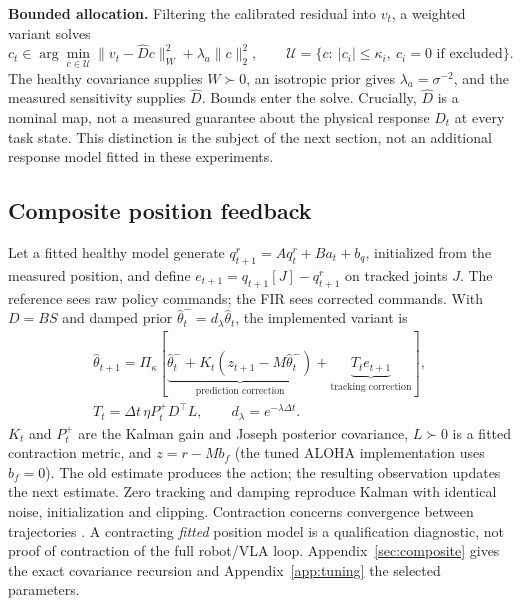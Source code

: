 \documentclass{article}
\begin{document}
\textbf{Bounded allocation.} Filtering the calibrated residual into $v_t$, a weighted
variant solves
\begin{equation}\label{eq:main-allocation}
 c_t\in\arg\min_{c\in\mathcal U}
       \|v_t-\widehat D c\|_W^2+\lambda_a\|c\|_2^2,
 \qquad \mathcal U=\{c:\ |c_i|\le\kappa_i,\ c_i=0\text{ if excluded}\}.
\end{equation}
The healthy covariance supplies $W\succ0$, an isotropic prior gives $\lambda_a=\sigma^{-2}$,
and the measured sensitivity supplies
$\widehat D$. Bounds enter the solve. Crucially, $\widehat D$ is a nominal map, not a measured
guarantee about the physical response $D_t$ at every task state. This distinction is the
subject of the next section, not an additional response model fitted in these experiments.

\subsection{Composite position feedback}
Let a fitted healthy model generate $q^r_{t+1}=Aq^r_t+Ba_t+b_q$, initialized from the measured
position, and define $e_{t+1}=q_{t+1}[J]-q^r_{t+1}$ on tracked joints $J$. The reference sees
raw policy commands; the FIR sees corrected commands. With $D=BS$ and damped prior
$\hat\theta_t^-=d_\lambda\hat\theta_t$, the implemented variant is
\begin{equation}\label{eq:main-composite}
\begin{aligned}
 \hat\theta_{t+1}=\Pi_\kappa\!\left[
 \underbrace{\hat\theta_t^-+K_t(z_{t+1}-M\hat\theta_t^-)}_{\text{prediction correction}}
 +\underbrace{T_t e_{t+1}}_{\text{tracking correction}}\right],\\
 T_t=\Delta t\,\eta P_t^+D^\top L,
 \qquad d_\lambda=e^{-\lambda\Delta t}.
\end{aligned}
\end{equation}
$K_t$ and $P_t^+$ are the Kalman gain and Joseph posterior covariance, $L\succ0$ is a fitted
contraction metric, and $z=r-Mb_f$ (the tuned ALOHA implementation uses $b_f=0$).
The old estimate produces the action; the resulting observation updates the next estimate.
Zero tracking and damping reproduce Kalman with identical noise, initialization and clipping.
Contraction concerns convergence between trajectories \citep{lohmiller1998contraction}.
A contracting \emph{fitted} position model is a qualification diagnostic, not proof of
contraction of the full robot/VLA loop. Appendix~\ref{sec:composite} gives the exact covariance
recursion and Appendix~\ref{app:tuning} the selected parameters.
\end{document}
